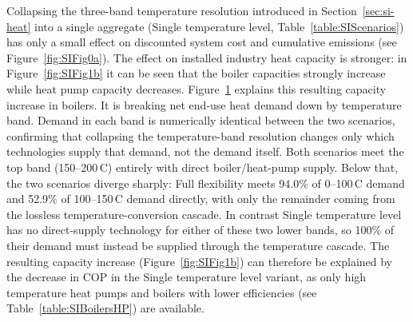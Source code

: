 Collapsing the three-band temperature resolution introduced in Section~\ref{sec:si-heat} into a single aggregate (Single temperature level, Table~\ref{table:SIScenarios}) has only a small effect on discounted system cost and cumulative emissions (see Figure~\ref{fig:SIFig0a}). The effect on installed industry heat capacity is stronger: in Figure~\ref{fig:SIFig1b} it can be seen that the boiler capacities strongly increase while heat pump capacity decreases. Figure~\ref{fig:SIFig3b} explains this resulting capacity increase in boilers. It is breaking net end-use heat demand down by temperature band. Demand in each band is numerically identical between the two scenarios, confirming that collapsing the temperature-band resolution changes only which technologies supply that demand, not the demand itself. Both scenarios meet the top band (150--200\,\degree C) entirely with direct boiler/heat-pump supply. Below that, the two scenarios diverge sharply: Full flexibility meets 94.0\% of 0--100\,\degree C demand and 52.9\% of 100--150\,\degree C demand directly, with only the remainder coming from the lossless temperature-conversion cascade. In contrast Single temperature level has no direct-supply technology for either of these two lower bands, so 100\% of their demand must instead be supplied through the temperature cascade. The resulting capacity increase (Figure~\ref{fig:SIFig1b}) can therefore be explained by the decrease in COP in the Single temperature level variant, as only high temperature heat pumps and boilers with lower efficiencies (see Table~\ref{table:SIBoilersHP}) are available.

\begin{figure}[h!]
    \centering
    
    \label{fig:SIFig3b}
\end{figure}

